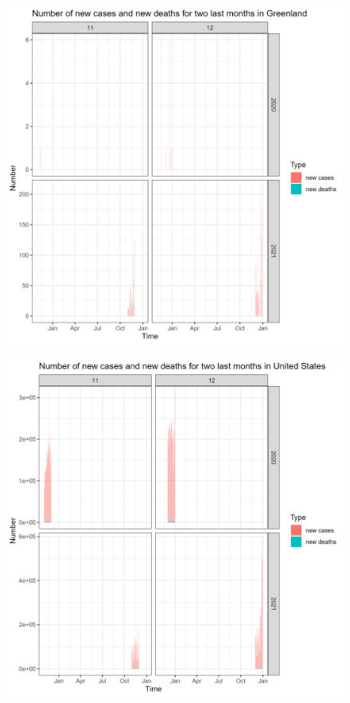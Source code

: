 \documentclass[a4paper]{article}
\theoremstyle{definition}
\begin{document}
\begin{enumerate}[i)]
\begin{enumerate}[1)]
\begin{figure}[H]
			\end{figure}
			\begin{figure}[H]
				\centering
				\includegraphics[scale=0.25]{images/6.6.2.png}
			\end{figure}
			\begin{figure}[H]
				\centering
				\includegraphics[scale=0.25]{images/6.6.3.png}

\end{figure}
\end{enumerate}
\end{enumerate}
\end{document}
